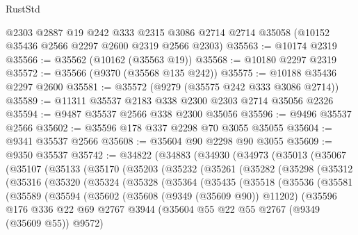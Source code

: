 \begin{lexlean}{RustStd}
\begin{coremodule}
{\begin{coremodule}
{{{{{{{{{{{{{{{{{{{{{{{{{{{{{{{{{{{{{{{    @2303
    @2887
    @19
    @242
    @333
    @2315
    @3086
    @2714
    @2714
    @35058
    (@10152 @35436 @2566 @2297 @2600 @2319 @2566 @2303)
@35563 := @10174 @2319
@35566 := @35562 (@10162 (@35563 @19))
@35568 := @10180 @2297 @2319
@35572 := @35566 (@9370 (@35568 @135 @242))
@35575 := @10188 @35436 @2297 @2600
@35581 := @35572 (@9279 (@35575 @242 @333 @3086 @2714))
@35589 := @11311 @35537 @2183 @338 @2300 @2303 @2714 @35056 @2326
@35594 := @9487 @35537 @2566 @338 @2300 @35056
@35596 := @9496 @35537 @2566
@35602 := @35596 @178 @337 @2298 @70 @3055 @35055
@35604 := @9341 @35537 @2566
@35608 := @35604 @90 @2298 @90 @3055
@35609 := @9350 @35537
@35742 := @34822
    (@34883
      (@34930
        (@34973
          (@35013
            (@35067
              (@35107
                (@35133
                  (@35170
                    (@35203
                      (@35232
                        (@35261
                          (@35282
                            (@35298
                              (@35312
                                (@35316
                                  (@35320
                                    (@35324
                                      (@35328
                                        (@35364
                                          (@35435
                                            (@35518
                                              (@35536
                                                (@35581
                                                  (@35589
                                                    (@35594
                                                      (@35602
                                                        (@35608 (@9349 (@35609 @90)) @11202)
                                                        (@35596
                                                          @176
                                                          @336
                                                          @22
                                                          @69
                                                          @2767
                                                          @3944
                                                          (@35604
                                                            @55
                                                            @22
                                                            @55
                                                            @2767
                                                            (@9349 (@35609 @55))
                                                            @9572)
}}}}}}}}}}}}}}}}}}}}}}}}}}}}}}}}}}}}}}}
\end{coremodule}}
\end{coremodule}
\end{lexlean}
